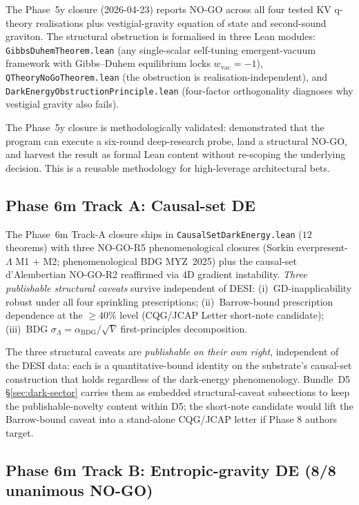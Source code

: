 \documentclass[aps,prd,reprint,nofootinbib,superscriptaddress]{revtex4-2}
\begin{document}
The Phase~5y closure (2026-04-23) reports NO-GO across all four
tested KV q-theory realisations plus vestigial-gravity equation of
state and second-sound graviton. The structural obstruction is
formalised in three Lean modules: \texttt{GibbsDuhemTheorem.lean}
(any single-scalar self-tuning emergent-vacuum framework with
Gibbs--Duhem equilibrium locks $w_{\mathrm{vac}} = -1$),
\texttt{QTheoryNoGoTheorem.lean} (the obstruction is
realisation-independent), and
\texttt{DarkEnergyObstructionPrinciple.lean} (four-factor orthogonality
diagnoses why vestigial gravity also fails).

The Phase~5y closure is methodologically validated:
\cite{Roehm2026D5} demonstrated that the program can execute a
six-round deep-research probe, land a structural NO-GO, and harvest
the result as formal Lean content without re-scoping the underlying
decision. This is a reusable methodology for high-leverage
architectural bets.

\subsection{Phase 6m Track A: Causal-set DE}

The Phase~6m Track-A closure ships in
\texttt{CausalSetDarkEnergy.lean} ($12$ theorems) with three NO-GO-R5
phenomenological closures (Sorkin everpresent-$\Lambda$ M1 + M2;
phenomenological BDG MYZ~2025) plus the causal-set d'Alembertian
NO-GO-R2 reaffirmed via 4D gradient instability. \emph{Three publishable
structural caveats} survive independent of DESI: (i)~GD-inapplicability
robust under all four sprinkling prescriptions; (ii)~Barrow-bound
prescription dependence at the $\geq 40\%$ level (CQG/JCAP Letter
short-note candidate); (iii)~BDG $\sigma_\Lambda = \alpha_{\mathrm{BDG}}/
\sqrt{V}$ first-principles decomposition.

The three structural caveats are \emph{publishable on their own
right}, independent of the DESI data: each is a quantitative-bound
identity on the substrate's causal-set construction that holds
regardless of the dark-energy phenomenology. Bundle~D5
\S\ref{sec:dark-sector} carries them as embedded structural-caveat
subsections to keep the publishable-novelty content within D5; the
short-note candidate would lift the Barrow-bound caveat into a
stand-alone CQG/JCAP letter if Phase 8 authors target.

\subsection{Phase 6m Track B: Entropic-gravity DE (8/8 unanimous NO-GO)}
\end{document}

